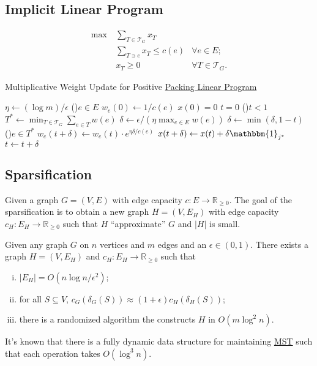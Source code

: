 \subsection{Implicit Linear Program}
\[
	\begin{aligned}
		\max~ & \sum_{T \in \mathcal{T} _G} x_T                                 \\
		      & \sum_{T \ni e} x_T \leq c(e)    & \forall e \in E ;             \\
		      & x_T \geq 0                      & \forall T \in \mathcal{T} _G.
	\end{aligned}
\]

\begin{algorithm}[H]\label{algo:MWU-discrete-tree-packing}
	\DontPrintSemicolon{}
	\caption{Multiplicative Weight Update for Positive \hyperref[def:packing-LP]{Packing Linear Program}}
	\BlankLine

	\(\eta \gets (\log m) / \epsilon \)\;
	\For(){\(e \in E\)}{
		\(w_e(0) \gets 1 / c(e)\)\;
	}
	\(x(0) = 0\)
	\(t = 0\)\;
	\;
	\While(){\(t < 1\)}{
	\(T ^{\ast} \gets \min _{T \in \mathcal{T} _{G}} \sum_{e \in T} w(e)\)\;
	\(\delta \gets \epsilon / (\eta \max _{e \in E} w(e))\)
	\(\delta \gets \min (\delta , 1 - t)\)
	\For(){\(e \in T^{\ast} \)}{
		\(w_e(t+\delta ) \gets w_e(t) \cdot e^{\eta \delta / c(e)}\)\;
	}
	\(x (t+\delta ) \gets x (t) + \delta \mathbbm{1}_{j^{\ast} }\)\;
	\(t \gets t + \delta \)\;
	}
	\;
\end{algorithm}

\subsection{Sparsification}
Given a graph \(G = (V, E)\) with edge capacity \(c \colon E \to \mathbb{R} _{\geq 0}\). The goal of the sparsification is to obtain a new graph \(H = (V, E_H )\) with edge capacity \(c_H \colon E_H \to \mathbb{R} _{\geq 0}\) such that \(H\) ``approximate'' \(G\) and \(\lvert H \rvert \) is small.

\begin{theorem}
	Given any graph \(G\) on \(n\) vertices and \(m\) edges and an \(\epsilon \in (0, 1)\). There exists a graph \(H = (V, E_{H})\) and \(c_H \colon E_H \to \mathbb{R} _{\geq 0}\) such that
	\begin{enumerate}[(i)]
		\item \(\lvert E_H \rvert = O(n \log n / \epsilon ^2)\);
		\item for all \(S \subseteq V\), \(c_G(\delta _G(S)) \approx (1 + \epsilon ) c_H(\delta _H(S))\);
		\item there is a randomized algorithm the constructs \(H\) in \(O(m \log ^2 n)\).
	\end{enumerate}
\end{theorem}
It's known that there is a fully dynamic data structure for maintaining \hyperref[prb:MST]{MST} such that each operation takes \(O(\log ^3 n)\).